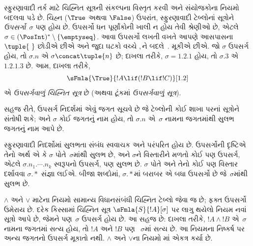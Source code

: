 સ્ફુરણાવાદી તર્ક માટે ચિહ્નિત સૂત્રની સંકલ્પના
વિસ્તૃત કરવી અને સંયોજકોના નિયમો બદલવા પડે છે.
ચિહ્ન ($\True$ અથવા $\False$) ઉપરાંત,
સ્ફુરણાવાદી ટેબ્લોનાં સૂત્રોને
\emph{ઉપસર્ગો}~$\sigma$ પણ હોય છે.
ઉપસર્ગો ધન પૂર્ણાંકોની ખાલી ન હોય તેવી શ્રેણીઓ છે,
એટલે $\sigma \in (\PosInt)^* \setminus \{\emptyseq\}$.
આવા ઉપસર્ગો લખતી વખતે આપણે આસપાસના
$\tuple{\ }$ છોડીએ છીએ અને જુદા ઘટકો
વચ્ચે $,$ને બદલે~$.$ મૂકીએ છીએ. જો $\sigma$
ઉપસર્ગ હોય, તો $\sigma.n$ એ $\sigma \concat \tuple{n}$
છે; દાખલા તરીકે, $\sigma = 1.2.1$ હોય, તો
$\sigma.3$ એ $1.2.1.3$ છે. આમ, દાખલા તરીકે,
\[
\sFmla{\True}{!A \lif (!B \lif !C)}[1.2]
\]
એ \emph{ઉપસર્ગવાળું ચિહ્નિત સૂત્ર} છે
(અથવા ટૂંકમાં \emph{ઉપસર્ગવાળું સૂત્ર}).

સહજ રીતે, ઉપસર્ગ નિદર્શમાં એવું જગત સૂચવે છે જે
ટેબ્લોની કોઈ શાખા પરનાં સૂત્રોને
સંતોષી શકે; અને $\sigma$ કોઈ જગતનું નામ હોય, તો
$\sigma.n$ એ~$\sigma$ નામના જગતમાંથી સુલભ જગતનું
નામ આપે છે.

સ્ફુરણાવાદી નિદર્શોમાં સુલભતા સંબંધ સ્વવાચક અને
પરંપરિત હોય છે. ઉપસર્ગોની દૃષ્ટિએ તેનો અર્થ એ કે
$\sigma$ પોતે~$\sigma$માંથી સુલભ છે, અને
$\sigma$ને વિસ્તારીને મળતો કોઈ પણ ઉપસર્ગ,
એટલે $\sigma.n_1.\cdots.n_k$ સ્વરૂપનો ઉપસર્ગ,
પણ સુલભ છે. $\sigma$ પોતે અને તેનો કોઈ પણ
વિસ્તાર દર્શાવવા $\sigma.*$ સંજ્ઞા લઈએ.
બીજા શબ્દોમાં, $\sigma.*$માં બરાબર એ બધા
ઉપસર્ગો છે જે~$\sigma$માંથી સુલભ છે.
\endgroup

\begingroup
\makeatletter{}\makeatother


\label{guunit:OLP-0513}


$\land$ અને $\lor$ માટેના નિયમો સામાન્ય વિધાનસંબંધી
ચિહ્નિત ટેબ્લો જેવા જ છે; ફક્ત ઉપસર્ગો ઉમેરાય છે.
દરેક કિસ્સામાં ચિહ્નિત સૂત્ર
$\sFmla{S}{!A}[\sigma]$ પર લાગુ થયેલો નિયમ નવાં
સૂત્રો આપે છે, જેમને પણ~$\sigma$ ઉપસર્ગ હોય છે.
આ સહજ છે: દાખલા તરીકે, $!A \land !B$ એ~$\sigma$
નામના જગતમાં સત્ય હોય, તો $!A$ અને $!B$ પણ
~$\sigma$માં સત્ય છે. આ નિયમના નિષ્કર્ષ પર અન્ય
જગતનો ઉપસર્ગ મૂકાતો નથી.
$\land$ અને $\lor$ના નિયમો માં
એકત્ર કર્યા છે.

